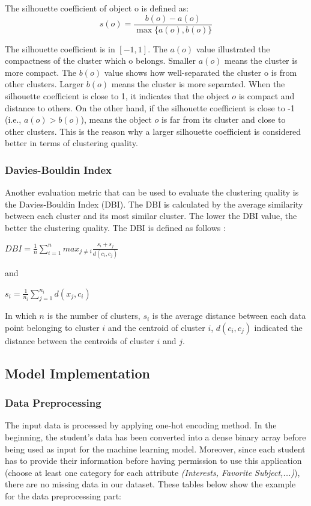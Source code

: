 \documentclass[12pt]{article}
\begin{document}
The silhouette coefficient of object o is defined as:
$$s(o) = \frac{b(o) - a(o)}{\max\{a(o),b(o)\}}$$

\noindent The silhouette coefficient is in $[-1,1]$. The $a(o)$ value illustrated
the compactness of the cluster which o belongs. Smaller $a(o)$ means the
cluster is more compact. The $b(o)$ value shows how well-separated the 
cluster o is from other clusters. Larger $b(o)$ means the cluster is
more separated. When the silhouette coefficient is close to 1, it indicates
that the object $o$ is compact and distance to others. On the other hand, 
if the silhouette coefficient is close to -1 (i.e., $a(o) > b(o)$), means
the object $o$ is far from its cluster and close to other clusters. This is
the reason why a larger silhouette coefficient is considered better in terms of
clustering quality. 


\subsubsection{Davies-Bouldin Index}

\noindent Another evaluation metric that can be used to evaluate
the clustering quality is the Davies-Bouldin Index (DBI). The DBI
is calculated by the average similarity between each cluster and its
most similar cluster. The lower the DBI value, the better the clustering
quality. The DBI is defined as follows \citep{HOSEN2023688}:
\begin{center}

$ DBI = \frac{1}{n} \sum_{i=1}^{n} max_{j \neq i} \frac{s_i + s_j}{d(c_i,c_j)}$

\end{center}
and
\begin{center}
$s_i = \frac{1}{n_i} \sum_{j=1}^{n_i} d(x_j,c_i)$
\end{center}
\noindent In which $n$ is the number of clusters, $s_i$ is the average distance between
each data point belonging to cluster $i$ and the centroid of cluster $i$, 
$d(c_i,c_j)$ indicated the distance between the centroids of cluster $i$ and
$j$.

\subsection{Model Implementation}
\subsubsection{Data Preprocessing}
The input data is processed by applying one-hot encoding method. In the beginning, the student's data has been converted into a dense binary array before being used as input for the machine learning model. Moreover, since each student has to provide their information before having permission to use this application (choose at least one category for each attribute \emph{(Interests, Favorite Subject,...)}), there are no missing data in our dataset. These tables below show the example for the data preprocessing part:
\end{document}
